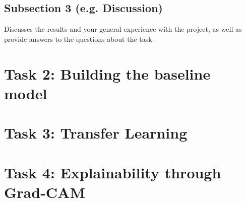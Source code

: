 \documentclass[conference]{IEEEtran}
\begin{document}
\subsection{Subsection 3 (e.g. Discussion)}
Discusses the results and your general experience with the project, as well as provide answers to the questions about the task.
\section{Task 2: Building the baseline model}
\section{Task 3: Transfer Learning}
\section{Task 4: Explainability through Grad-CAM}
\end{document}

